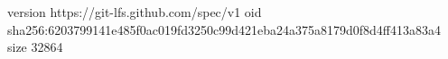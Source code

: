version https://git-lfs.github.com/spec/v1
oid sha256:6203799141e485f0ac019fd3250c99d421eba24a375a8179d0f8d4ff413a83a4
size 32864
